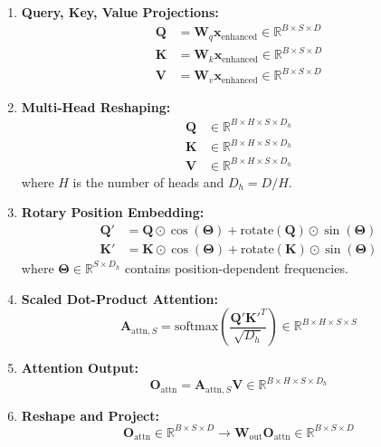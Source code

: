 \documentclass{article}
\begin{document}
\begin{enumerate}
\item \textbf{Query, Key, Value Projections:}
\begin{align}
\mathbf{Q} &= \mathbf{W}_q \mathbf{x}_{\text{enhanced}} \in \mathbb{R}^{B \times S \times D} \\
\mathbf{K} &= \mathbf{W}_k \mathbf{x}_{\text{enhanced}} \in \mathbb{R}^{B \times S \times D} \\
\mathbf{V} &= \mathbf{W}_v \mathbf{x}_{\text{enhanced}} \in \mathbb{R}^{B \times S \times D}
\end{align}

\item \textbf{Multi-Head Reshaping:}
\begin{align}
\mathbf{Q} &\in \mathbb{R}^{B \times H \times S \times D_h} \\
\mathbf{K} &\in \mathbb{R}^{B \times H \times S \times D_h} \\
\mathbf{V} &\in \mathbb{R}^{B \times H \times S \times D_h}
\end{align}
where $H$ is the number of heads and $D_h = D/H$.

\item \textbf{Rotary Position Embedding:}
\begin{align}
\mathbf{Q}' &= \mathbf{Q} \odot \cos(\boldsymbol{\Theta}) + \text{rotate}(\mathbf{Q}) \odot \sin(\boldsymbol{\Theta}) \\
\mathbf{K}' &= \mathbf{K} \odot \cos(\boldsymbol{\Theta}) + \text{rotate}(\mathbf{K}) \odot \sin(\boldsymbol{\Theta})
\end{align}
where $\boldsymbol{\Theta} \in \mathbb{R}^{S \times D_h}$ contains position-dependent frequencies.

\item \textbf{Scaled Dot-Product Attention:}
\begin{equation}
\mathbf{A}_{\text{attn},S} = \text{softmax}\left(\frac{\mathbf{Q}' \mathbf{K}'^T}{\sqrt{D_h}}\right) \in \mathbb{R}^{B \times H \times S \times S}
\end{equation}

\item \textbf{Attention Output:}
\begin{equation}
\mathbf{O}_{\text{attn}} = \mathbf{A}_{\text{attn},S} \mathbf{V} \in \mathbb{R}^{B \times H \times S \times D_h}
\end{equation}

\item \textbf{Reshape and Project:}
\begin{equation}
\mathbf{O}_{\text{attn}} \in \mathbb{R}^{B \times S \times D} \rightarrow \mathbf{W}_{\text{out}} \mathbf{O}_{\text{attn}} \in \mathbb{R}^{B \times S \times D}
\end{equation}


\end{enumerate}
\end{document}
